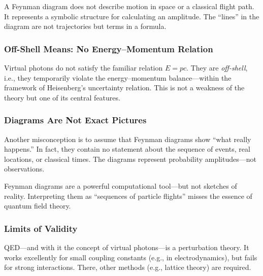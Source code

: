 \vspace{0.5em}
\begin{tcolorbox}[didaktikbox, title=No Particle Trajectory in the Diagram]
	\label{box: Keine Teilchenbahn im Diagramm}
	A Feynman diagram does not describe motion in space or a classical flight path. It represents a symbolic structure for calculating an amplitude. The “lines” in the diagram are not trajectories but terms in a formula.
\end{tcolorbox}

\subsubsection*{Off-Shell Means: No Energy–Momentum Relation}
Virtual photons do not satisfy the familiar relation $E = pc$. They are \emph{off-shell}, i.e., they temporarily violate the energy–momentum balance—within the framework of Heisenberg’s uncertainty relation. This is not a weakness of the theory but one of its central features.

\subsubsection*{Diagrams Are Not Exact Pictures}
Another misconception is to assume that Feynman diagrams show “what really happens.” In fact, they contain no statement about the sequence of events, real locations, or classical times. The diagrams represent probability amplitudes—not observations.

\vspace{0.5em}
\begin{tcolorbox}[warnbox, title=Warning: Do Not Take Feynman Diagrams Literally!]
	\label{box:Warnung}
	Feynman diagrams are a powerful computational tool—but not sketches of reality. Interpreting them as “sequences of particle flights” misses the essence of quantum field theory.
\end{tcolorbox}

\subsubsection*{Limits of Validity}
QED—and with it the concept of virtual photons—is a perturbation theory. It works excellently for small coupling constants (e.g., in electrodynamics), but fails for strong interactions. There, other methods (e.g., lattice theory) are required.

